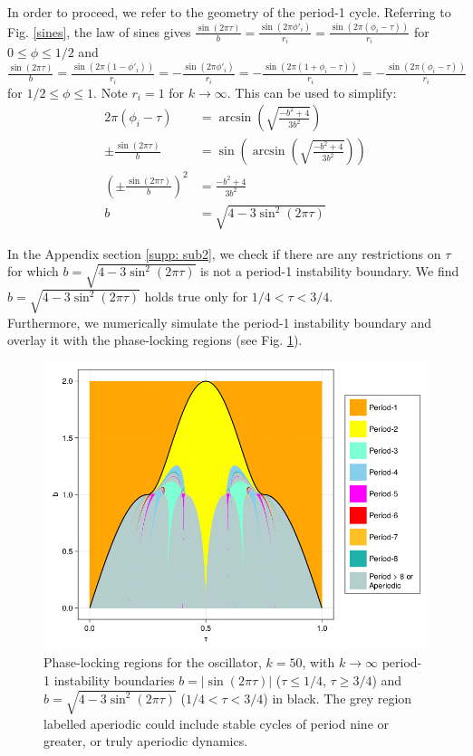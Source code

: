 \indent In order to proceed, we refer to the geometry of the period-1 cycle. Referring to Fig. \ref{sines}, the law of sines gives $\frac{\sin(2\pi \tau)}{b}=\frac{\sin(2\pi \phi'_i)}{r_i}=\frac{\sin(2\pi (\phi_i -\tau))}{r_i}$ for $0\leq \phi \leq1/2$ and $\frac{\sin(2\pi \tau)}{b}=\frac{\sin(2\pi (1-\phi'_i))}{r_i}=-\frac{\sin(2\pi \phi'_i)}{r_i}=-\frac{\sin(2\pi (1+\phi_i-\tau))}{r_i}=-\frac{\sin(2\pi (\phi_i-\tau))}{r_i}$ for $1/2\leq \phi \leq1$. Note $r_i=1$ for $k\rightarrow \infty$. This can be used to simplify:
\begin{align}
    2\pi(\phi_i - \tau) &= \arcsin(\sqrt{\frac{-b^2+4}{3b^2}}) \nonumber \\
    \pm\frac{\sin(2\pi \tau)}{b} &= \sin(\arcsin(\sqrt{\frac{-b^2+4}{3b^2}}))\nonumber \\
    (\pm\frac{\sin(2\pi \tau)}{b})^2 &= \frac{-b^2+4}{3b^2} \nonumber \\
    b &= \sqrt{4-3\sin^2(2\pi\tau)} 
    \label{eq:bound2}
\end{align}

In the Appendix section \ref{supp: sub2}, we check if there are any restrictions on $\tau$ for which $b = \sqrt{4-3\sin^2(2\pi\tau)}$ is not a period-1 instability boundary. We find $b = \sqrt{4-3\sin^2(2\pi\tau)}$ holds true only for $1/4<\tau<3/4$.\\

Furthermore, we numerically simulate the period-1 instability boundary and overlay it with the phase-locking regions (see Fig. \ref{p1-instab}). 

\begin{figure}[H]
    \begin{center}
    \includegraphics[width=.8\textwidth]{figures/big_plot_w_line.png}
    \end{center}
    \caption{Phase-locking regions for the oscillator, $k=50$, with $k\rightarrow \infty$ period-1 instability boundaries $b = |\sin(2\pi\tau)|$ ($\tau \leq 1/4$, $\tau \geq 3/4$) and $b = \sqrt{4-3\sin^2(2\pi\tau)}$ ($1/4<\tau<3/4$) in black. The grey region labelled aperiodic could include stable cycles of period nine or greater, or truly aperiodic dynamics.}
    \label{p1-instab}
\end{figure}

